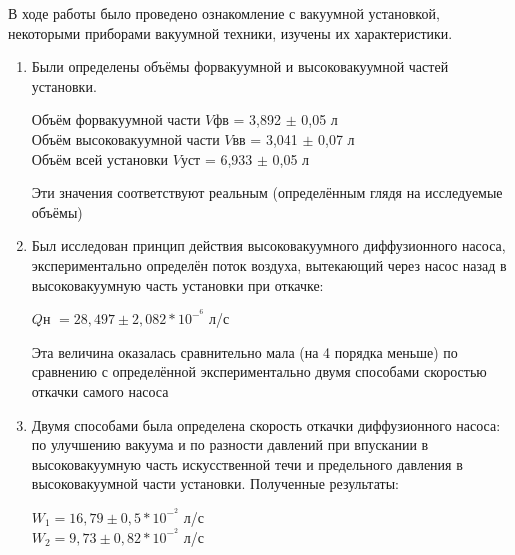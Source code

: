 \documentclass[a4paper]{article}
\begin{document}
В ходе работы было проведено ознакомление с вакуумной установкой, некоторыми приборами вакуумной техники, изучены их характеристики. 
\begin{enumerate}
    \item Были определены объёмы форвакуумной и высоковакуумной частей установки. 
    \begin{center}
    \begin{center}
Объём форвакуумной части $V$фв = 3,892 $\pm$ 0,05 л\\
Объём высоковакуумной части $V$вв = 3,041 $\pm$ 0,07 л\\
Объём всей установки $V$уст = 6,933 $\pm$ 0,05 л\\
\end{center}
Эти значения соответствуют реальным (определённым глядя на исследуемые объёмы)
    \end{center}
    
    \item Был исследован принцип действия высоковакуумного диффузионного насоса, экспериментально определён поток воздуха, вытекающий через насос назад в высоковакуумную часть установки при откачке:
    \begin{center}
    $Q$н $= 28,497 \pm 2,082 * 10^-^6$ л/с
    \end{center}
    Эта величина оказалась сравнительно мала (на 4 порядка меньше) по сравнению с определённой экспериментально двумя способами скоростью откачки самого насоса
    \item Двумя способами была определена скорость откачки диффузионного насоса: по улучшению вакуума и по разности давлений при впускании в высоковакуумную часть искусственной течи и предельного давления в высоковакуумной части установки.
    Полученные результаты:
\begin{center}
$W_1 = 16,79 \pm 0,5 * 10^-^2$ л/с\\
$W_2 = 9,73 \pm 0,82 * 10^-^2$ л/с
\end{center}


\end{enumerate}
\end{document}
